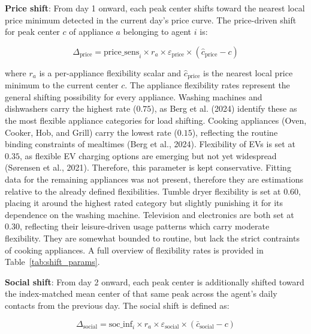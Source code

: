 \documentclass[11pt, a4paper]{article}
\begin{document}
\medskip

\textbf{Price shift}: From day 1 onward, each peak center shifts toward the nearest local price minimum detected in the current day's price curve. The price-driven shift for peak center $c$ of appliance $a$ belonging to agent $i$ is:

\begin{equation} \label{eq:price_shift}
    \Delta_{\text{price}} = \text{price\_sens}_i \times r_a \times \varepsilon_{\text{price}} \times (\hat{c}_{\text{price}} - c)
\end{equation}

\noindent where $r_a$ is a per-appliance flexibility scalar and $\hat{c}_{\text{price}}$ is the nearest local price minimum to the current center $c$. The appliance flexibility rates represent the general shifting possibility for every appliance. Washing machines and dishwashers carry the highest rate ($0.75$), as Berg et al. (2024) identify these as the most flexible appliance categories for load shifting. Cooking appliances (Oven, Cooker, Hob, and Grill) carry the lowest rate ($0.15$), reflecting the routine binding constraints of  mealtimes (Berg et al., 2024). Flexibility of EVs is set at $0.35$, as flexible EV charging options are emerging but not yet widespread (Sørensen et al., 2021). Therefore, this parameter is kept conservative. Fitting data for the remaining appliances was not present, therefore they are estimations relative to the already defined flexibilities. Tumble dryer flexibility is set at $0.60$, placing it around the highest rated category but slightly punishing it for its dependence on the washing machine.  Television and electronics are both set at $0.30$, reflecting their leisure-driven usage patterns which carry moderate flexibility. They are somewhat bounded to routine, but lack the strict contraints of cooking appliances. A full overview of flexibility rates is provided in Table~\ref{tab:shift_params}.
\medskip

\textbf{Social shift}: From day 2 onward, each peak center is additionally shifted toward the index-matched mean center of that same peak across the agent's daily contacts from the previous day. The social shift is defined as:

\begin{equation} \label{eq:social_shift}
    \Delta_{\text{social}} = \text{soc\_inf}_i \times r_a \times \varepsilon_{\text{social}} \times (\bar{c}_{\text{social}} - c)
\end{equation}
\end{document}
